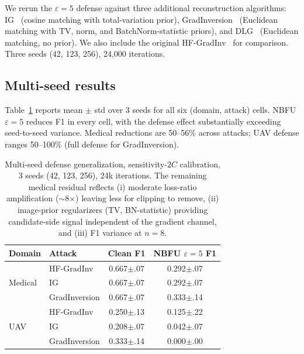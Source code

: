 \documentclass[11pt]{article}
\begin{document}
We rerun the $\varepsilon{=}5$ defense against three additional reconstruction algorithms: IG~\citep{ig2020} (cosine matching with total-variation prior), GradInversion~\citep{gradinversion2021} (Euclidean matching with TV, norm, and BatchNorm-statistic priors), and DLG~\citep{dlg2019} (Euclidean matching, no prior). We also include the original HF-GradInv~\citep{hfgradinv2024} for comparison. Three seeds (42, 123, 256), 24{,}000 iterations.

\subsection{Multi-seed results}
Table~\ref{tab:multiseed} reports mean $\pm$ std over 3 seeds for all six (domain, attack) cells. NBFU $\varepsilon{=}5$ reduces F1 in every cell, with the defense effect substantially exceeding seed-to-seed variance. Medical reductions are 50--56\% across attacks; UAV defense ranges 50--100\% (full defense for GradInversion).

\begin{table}[t]
\centering
\small
\setlength{\tabcolsep}{4pt}
\begin{tabular}{llcc}
\toprule
Domain & Attack & Clean F1 & NBFU $\varepsilon{=}5$ F1 \\
\midrule
\multirow{3}{*}{Medical}
 & HF-GradInv     & 0.667$\pm$.07 & 0.292$\pm$.07 \\
 & IG             & 0.667$\pm$.07 & 0.292$\pm$.07 \\
 & GradInversion  & 0.667$\pm$.07 & 0.333$\pm$.14 \\
\midrule
\multirow{3}{*}{UAV}
 & HF-GradInv     & 0.250$\pm$.13 & 0.125$\pm$.22 \\
 & IG             & 0.208$\pm$.07 & 0.042$\pm$.07 \\
 & GradInversion  & 0.333$\pm$.14 & 0.000$\pm$.00 \\
\bottomrule
\end{tabular}
\caption{Multi-seed defense generalization, sensitivity-$2C$ calibration, 3 seeds (42, 123, 256), 24k iterations. The remaining medical residual reflects (i) moderate loss-ratio amplification ($\sim$8$\times$) leaving less for clipping to remove, (ii) image-prior regularizers (TV, BN-statistic) providing candidate-side signal independent of the gradient channel, and (iii) F1 variance at $n{=}8$.}
\label{tab:multiseed}
\end{table}
\end{document}
